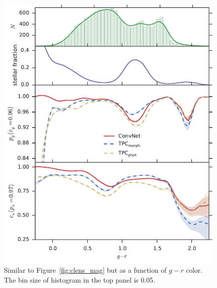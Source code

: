 \documentclass[fleqn,usenatbib]{mnras}
\begin{document}
\begin{figure}
  \centering
  \includegraphics[width=\columnwidth]{figures/clens_g_r.pdf}
  \caption{Similar to Figure~\ref{fig:clens_mag}
           but as a function of $g-r$ color.
           The bin size of histogram in the top panel is 0.05.}
  \label{fig:clens_g_r}
\end{figure}
\end{document}
